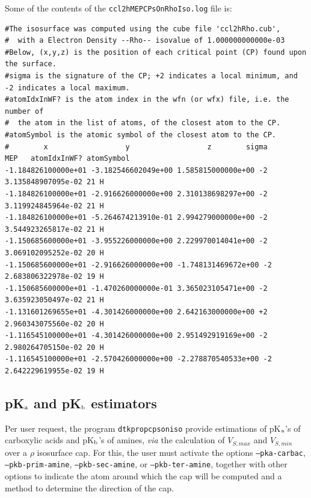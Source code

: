 Some of the contents of the \texttt{ccl2hMEPCPsOnRhoIso.log} file is:
\begin{scriptsize}
\begin{verbatim}
#The isosurface was computed using the cube file 'ccl2hRho.cub',
#  with a Electron Density --Rho-- isovalue of 1.000000000000e-03
#Below, (x,y,z) is the position of each critical point (CP) found upon the surface.
#sigma is the signature of the CP; +2 indicates a local minimum, and -2 indicates a local maximum.
#atomIdxInWF? is the atom index in the wfn (or wfx) file, i.e. the number of
#  the atom in the list of atoms, of the closest atom to the CP.
#atomSymbol is the atomic symbol of the closest atom to the CP.
#        x                  y                  z        sigma       MEP   atomIdxInWF? atomSymbol
-1.184826100000e+01 -3.182546602049e+00 1.585815000000e+00 -2 3.135848907095e-02 21 H
-1.184826100000e+01 -2.916626000000e+00 2.310138698297e+00 -2 3.119924845964e-02 21 H
-1.184826100000e+01 -5.264674213910e-01 2.994279000000e+00 -2 3.544923265817e-02 21 H
-1.150685600000e+01 -3.955226000000e+00 2.229970014041e+00 -2 3.069102095252e-02 20 H
-1.150685600000e+01 -2.916626000000e+00 -1.748131469672e+00 -2 2.683806322978e-02 19 H
-1.150685600000e+01 -1.470260000000e-01 3.365023105471e+00 -2 3.635923050497e-02 21 H
-1.131601269655e+01 -4.301426000000e+00 2.642163000000e+00 +2 2.960343075560e-02 20 H
-1.116545100000e+01 -4.301426000000e+00 2.951492919169e+00 -2 2.980264705150e-02 20 H
-1.116545100000e+01 -2.570426000000e+00 -2.278870540533e+00 -2 2.642229619955e-02 19 H
\end{verbatim}
\end{scriptsize}

\subsection{pK$_{\textrm a}$ and pK$_{\textrm b}$ estimators}

Per user request, the program \texttt{dtkpropcpsoniso} provide estimations of
pK$_{\textrm a}$'s of carboxylic acids and pK$_{\textrm b}$'s of amines,
\textit{via} the calculation of $V_{S,max}$ and $V_{S,min}$ over a $\rho$ isosurface cap.
For this, the user must activate the options \texttt{--pka-carbac}, \texttt{--pkb-prim-amine},
\texttt{--pkb-sec-amine}, or \texttt{--pkb-ter-amine}, together with other options to
indicate the atom around which the cap will be computed and a method to determine the
direction of the cap.


